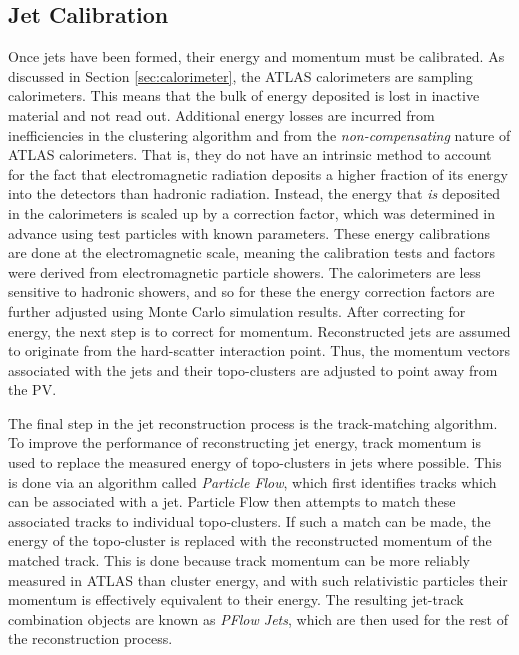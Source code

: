         \FloatBarrier
        \subsection{Jet Calibration}

        Once jets have been formed, their energy and momentum must be calibrated.
        As discussed in Section \ref{sec:calorimeter}, the ATLAS calorimeters are sampling calorimeters.
        This means that the bulk of energy deposited is lost in inactive material and not read out.
        Additional energy losses are incurred from inefficiencies in the clustering algorithm and from the \textit{non-compensating} nature of ATLAS calorimeters.
        That is, they do not have an intrinsic method to account for the fact that electromagnetic radiation deposits a higher fraction of its energy into the detectors than hadronic radiation\cite{cell_clustering}.
        Instead, the energy that \textit{is} deposited in the calorimeters is scaled up by a correction factor,
            which was determined in advance using test particles with known parameters\cite{jet_energy_measurment}.
        These energy calibrations are done at the electromagnetic scale,
            meaning the calibration tests and factors were derived from electromagnetic particle showers.
        The calorimeters are less sensitive to hadronic showers,
            and so for these the energy correction factors are further adjusted using Monte Carlo simulation results.
        After correcting for energy, the next step is to correct for momentum.
        Reconstructed jets are assumed to originate from the hard-scatter interaction point.
        Thus, the momentum vectors associated with the jets and their topo-clusters are adjusted to point away from the PV.

        The final step in the jet reconstruction process is the track-matching algorithm.
        To improve the performance of reconstructing jet energy,
            track momentum is used to replace the measured energy of topo-clusters in jets where possible.
        This is done via an algorithm called \textit{Particle Flow},
            which first identifies tracks which can be associated with a jet.
        Particle Flow then attempts to match these associated tracks to individual topo-clusters.
        If such a match can be made, the energy of the topo-cluster is replaced with the reconstructed momentum of the matched track.
        This is done because track momentum can be more reliably measured in ATLAS than cluster energy,
            and with such relativistic particles their momentum is effectively equivalent to their energy.
        The resulting jet-track combination objects are known as \textit{PFlow Jets},
            which are then used for the rest of the reconstruction process\cite{pflow}.


